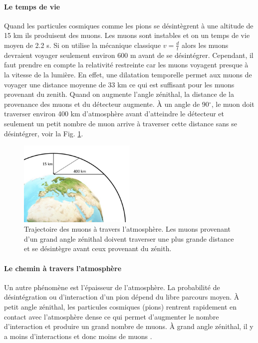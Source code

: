 \documentclass[12pt]{article}
\begin{document}
\paragraph{Le temps de vie}
Quand les particules cosmiques comme les pions se désintègrent à une altitude de 15 km ils produisent des muons. Les muons sont instables et on un temps de vie moyen de 2.2 \SIUnitSymbolMicro s. Si on utilise la mécanique classique $v=\frac{d}{t}$ alors les muons devraient voyager seulement environ 600 m avant de se désintégrer. Cependant, il faut prendre en compte la relativité restreinte car les muons voyagent presque à la vitesse de la lumière. En effet, une dilatation temporelle permet aux muons de voyager une distance moyenne de 33 km ce qui est suffisant pour les muons provenant du zenith. Quand on augmente l'angle zénithal, la distance de la provenance des muons et du détecteur augmente. À un angle de 90$^\circ$, le muon doit traverser environ 400 km d'atmosphère avant d'atteindre le détecteur et seulement un petit nombre de muon arrive à traverser cette distance sans se désintégrer, voir la Fig. \ref{fig:PathMuonAtmosphere}.
\begin{figure}[!htbp]
    \centering
    \includegraphics[width=0.5\textwidth]{Images/Schemas/PathOfMuonThroughAtmosphere.jpg}
    \caption{Trajectoire des muons à travers l'atmosphère. Les muons provenant d'un grand angle zénithal doivent traverser une plus grande distance et se désintègre avant ceux provenant du zénith.}
    \label{fig:PathMuonAtmosphere}
\end{figure}
\paragraph{Le chemin à travers l'atmosphère}
Un autre phénomène est l'épaisseur de l'atmosphère. La probabilité de désintégration ou d'interaction d'un pion dépend du libre parcours moyen. À petit angle zénithal, les particules cosmiques (pions) rentrent rapidement en contact avec l'atmosphère dense ce qui permet d'augmenter le nombre d'interaction et produire un grand nombre de muons. À grand angle zénithal, il y a moins d'interactions et donc moins de muons \cite{schwerdt_measurement_2018}.
\end{document}
